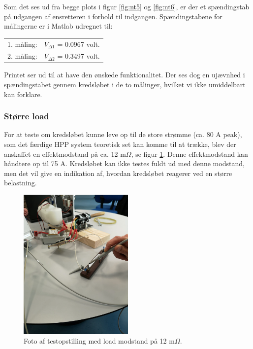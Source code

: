Som det ses ud fra begge plots i figur \ref{fig:nt5} og \ref{fig:nt6}, er der et spændingstab på udgangen af ensretteren i forhold til indgangen. Spændingstabene for målingerne er i Matlab udregnet til:

\begin{tabular}{p{2cm}l}
  1. måling: &$V_{\Delta 1}$ = 0.0967 volt.\\
  2. måling: &$V_{\Delta 2}$ = 0.3497 volt.\\
\end{tabular}

Printet ser ud til at have den ønskede funktionalitet. Der ses dog en ujævnhed i spændingstabet gennem kredsløbet i de to målinger, hvilket vi ikke umiddelbart kan forklare.


\subsubsection{Større load}
\label{sec:storre-load}

For at teste om kredsløbet kunne leve op til de store strømme (ca. 80 A peak), som det færdige HPP system teoretisk set kan komme til at trække, blev der anskaffet en effektmodstand på ca. 12 m$\Omega$, se figur \ref{fig:nt7}. Denne effektmodstand kan håndtere op til 75 A. Kredsløbet kan ikke testes fuldt ud med denne modstand, men det vil give en indikation af, hvordan kredsløbet reagerer ved en større belastning.

\begin{figure}[h]
  \centering
  \includegraphics[width=0.5\textwidth]{./figurer/nt7.png}
  \caption{Foto af testopstilling med load modstand på 12 m$\Omega$.}
  \label{fig:nt7}
\end{figure}

